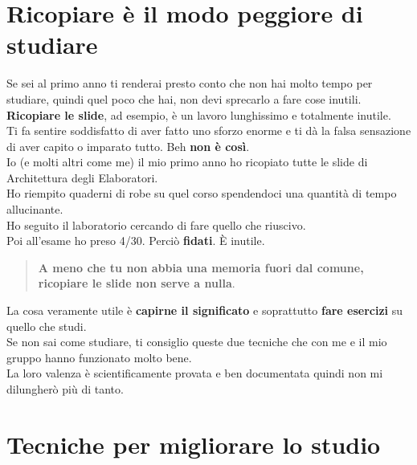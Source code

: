 \documentclass[18pt]{extarticle}
\begin{document}
\section{Ricopiare è il modo peggiore di studiare}
Se sei al primo anno ti renderai presto conto che non hai molto tempo per studiare, quindi quel poco che hai, non devi sprecarlo a fare cose inutili.\\
\textbf{Ricopiare le slide}, ad esempio, è un lavoro lunghissimo e totalmente inutile.\\
Ti fa sentire soddisfatto di aver fatto uno sforzo enorme e ti dà la falsa sensazione di aver capito o imparato tutto. 
Beh \textbf{non è così}.\\
Io (e molti altri come me) il mio primo anno ho ricopiato tutte le slide di Architettura degli Elaboratori.\\
Ho riempito quaderni di robe su quel corso spendendoci una quantità di tempo allucinante.\\
Ho seguito il laboratorio cercando di fare quello che riuscivo.\\
Poi all'esame ho preso 4/30. Perciò \textbf{fidati}. È inutile.
\begin{quote}
\textbf{A meno che tu non abbia una memoria fuori dal comune, ricopiare le slide non serve a nulla}.
\end{quote}%
La cosa veramente utile è \textbf{capirne il significato} e soprattutto \textbf{fare esercizi} su quello che studi.\\
Se non sai come studiare, ti consiglio queste due tecniche che con me e il mio gruppo hanno funzionato molto bene.\\
La loro valenza è scientificamente provata e ben documentata quindi non mi dilungherò più di tanto.


\section{Tecniche per migliorare lo studio}
\end{document}
